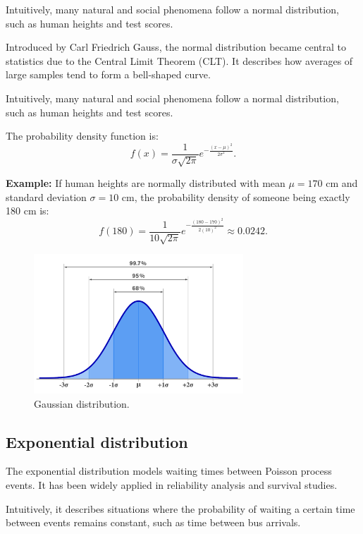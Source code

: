 \documentclass{book}
\begin{document}
Intuitively, many natural and social phenomena follow a normal distribution, such as human heights and test scores.

Introduced by Carl Friedrich Gauss, the normal distribution became central to statistics due to the Central Limit Theorem (CLT). It describes how averages of large samples tend to form a bell-shaped curve.

Intuitively, many natural and social phenomena follow a normal distribution, such as human heights and test scores.

The probability density function is:
\begin{equation}
    f(x) = \frac{1}{\sigma \sqrt{2\pi}} e^{-\frac{(x-\mu)^2}{2\sigma^2}}.
\end{equation}

\textbf{Example:} If human heights are normally distributed with mean $\mu=170$ cm and standard deviation $\sigma=10$ cm, the probability density of someone being exactly 180 cm is:
\begin{equation}
    f(180) = \frac{1}{10 \sqrt{2\pi}} e^{-\frac{(180-170)^2}{2(10)^2}} \approx 0.0242.
\end{equation}

\begin{figure}[ht]
    \centering
    \includegraphics[width=0.7\textwidth]{figures/gaussian.png}
    \caption{Gaussian distribution.}
    \label{fig:random}
\end{figure}

\newpage
\subsection{Exponential distribution}
The exponential distribution models waiting times between Poisson process events. It has been widely applied in reliability analysis and survival studies.

Intuitively, it describes situations where the probability of waiting a certain time between events remains constant, such as time between bus arrivals.
\end{document}
